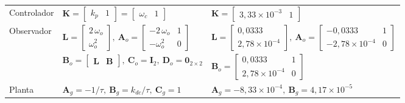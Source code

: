 \begin{table}[tbp]
{\begin{tabular}{lll}
Controlador &
$\mathbf{K} = \begin{bmatrix} k_p & 1 \end{bmatrix} = \begin{bmatrix} \omega_c & 1 \end{bmatrix}$ &
$\mathbf{K} = \begin{bmatrix} 3{,}33\times10^{-3} & 1 \end{bmatrix}$ \\
Observador &
$\mathbf{L} = \begin{bmatrix} 2\,\omega_o \\ \omega_o^2 \end{bmatrix},\
\mathbf{A}_o = \begin{bmatrix} -2\,\omega_o & 1 \\ -\omega_o^2 & 0 \end{bmatrix}$ &
$\mathbf{L} = \begin{bmatrix} 0{,}0333 \\ 2{,}78\times10^{-4} \end{bmatrix},\
\mathbf{A}_o = \begin{bmatrix} -0{,}0333 & 1 \\ -2{,}78\times10^{-4} & 0 \end{bmatrix}$ \\
 &
$\mathbf{B}_o = \begin{bmatrix} \mathbf{L} & \mathbf{B} \end{bmatrix},\
\mathbf{C}_o = \mathbf{I}_2,\ \mathbf{D}_o = \mathbf{0}_{2\times 2}$ &
$\mathbf{B}_o = \begin{bmatrix} 0{,}0333 & 1 \\ 2{,}78\times10^{-4} & 0 \end{bmatrix}$ \\
Planta &
$\mathbf{A}_g = -1/\tau,\ \mathbf{B}_g = k_{dc}/\tau,\ \mathbf{C}_g = 1$ &
$\mathbf{A}_g = -8{,}33\times10^{-4},\ \mathbf{B}_g = 4{,}17\times10^{-5}$ \\
\bottomrule
\end{tabular}%
}
\end{table}

